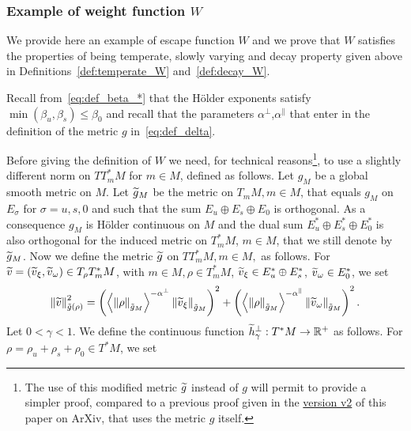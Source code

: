 \documentclass[AHL,Unicode,longabstracts,published]{cedram}
\newcommand{\bbR}{\mathbb{R}}
\let\oldtilde\tilde
\renewcommand*{\tilde}[1]{\mathchoice{\widetilde{#1}}{\widetilde{#1}}{\oldtilde{#1}}{\oldtilde{#1}}}
\newcommand{\bbR}{\mathbb{R}}
\begin{document}
\subsubsection{Example of weight function \texorpdfstring{$W$}{W}}\label{subsec:Escape-function}

We provide here an example of escape function $W$ and we prove that $W$ satisfies the properties of being temperate, slowly varying and decay property given above in Definitions~\ref{def:temperate_W} and~\ref{def:decay_W}.

Recall from~\eqref{eq:def_beta_*} that the H\"older exponents satisfy $\min(\beta_{u},\beta_{s})\leq\beta_{0}$ and recall that the parameters $\alpha^{\perp}$,$\alpha^{\parallel}$ that enter in the definition of the metric $g$ in~\eqref{eq:def_delta}.

Before giving the definition of $W$ we need, for technical reasons\footnote{The use of this modified metric $\tilde{g}$ instead of $g$ will permit to provide a simpler proof, compared to a previous proof given in the \href{https://arxiv.org/pdf/1706.09307v2.pdf\#page=52}{version v2} of this paper on ArXiv, that uses the metric $g$ itself.}, to use a slightly different norm on $TT_{m}^{*}M$ for $m\in M$, defined as follows. Let $g_{M}$ be a global smooth metric on $M$. Let $\tilde{g}_{M}$ be the metric on $T_{m}M,m\in M$, that equals $g_{M}$ on $E_{\sigma}$ for $\sigma=u,s,0$ and such that the sum $E_{u}\oplus E_{s}\oplus E_{0}$ is orthogonal. As a consequence $g_{M}$ is H\"older continuous on $M$ and the dual sum $E_{u}^{*}\oplus E_{s}^{*}\oplus E_{0}^{*}$ is also orthogonal for the induced metric on $T_{m}^{*}M$, $m\in M$, that we still denote by $\tilde{g}_{M}$. Now we define the metric $\tilde{g}$ on $TT_{m}^{*}M,m\in M,$ as follows. For $\tilde{v}=(\tilde{v}_{\xi},\tilde{v}_{\omega})\in T_{\rho}T_{m}^{*}M$, with $m\in M,\rho\in T_{m}^{*}M$, $\tilde{v}_{\xi}\in E_{u}^{*}\oplus E_{s}^{*}$, $\tilde{v}_{\omega}\in E_{0}^{*}$, we set
\begin{equation}\label{eq:norm_g-1}
\left\Vert \tilde{v}\right\Vert _{\tilde{g}\left(\rho\right)}^{2}=\left(\left\langle \left\Vert \rho\right\Vert _{\tilde{g}_{M}}\right\rangle ^{-\alpha^{\perp}}\left\Vert \tilde{v}_{\xi}\right\Vert _{\tilde{g}_{M}}\right)^{2}+\left(\left\langle \left\Vert \rho\right\Vert _{\tilde{g}_{M}}\right\rangle ^{-\alpha^{\parallel}}\left\Vert \tilde{v}_{\omega}\right\Vert _{\tilde{g}_{M}}\right)^{2}.
\end{equation}
Let $0<\gamma<1$. We define the continuous function $\tilde{h}_{\gamma}^{\perp}:T^{*}M\rightarrow\bbR^{+}$ as follows. For $\rho=\rho_{u}+\rho_{s}+\rho_{0}\in T^{*}M$, we set
\end{document}
